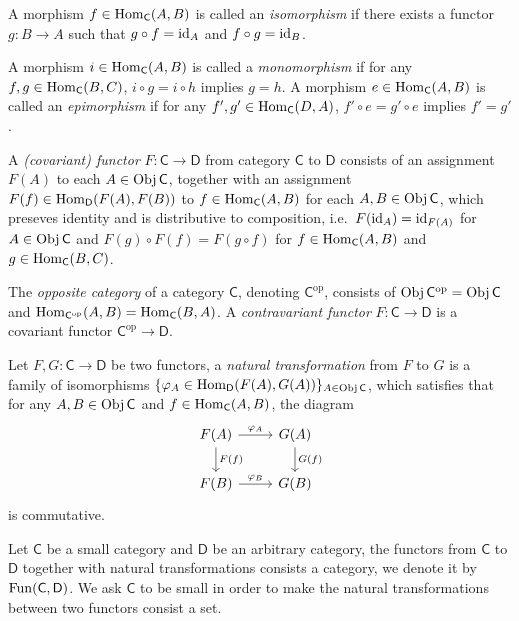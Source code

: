 \begin{defn}
    A morphism $f\in\operatorname{Hom}_\mathsf{C}(A,B)$ is called an \emph{isomorphism} if there exists a functor $g:B\to A$ such that $g\circ f=\mathrm{id}_A$ and $f\circ g=\mathrm{id}_B$.

    A morphism $i\in\operatorname{Hom}_\mathsf{C}(A,B)$ is called a \emph{monomorphism} if for any $f,g\in\operatorname{Hom}_\mathsf{C}(B,C)$, $i\circ g=i\circ h$ implies $g=h$.
    A morphism $e\in\operatorname{Hom}_\mathsf{C}(A,B)$ is called an \emph{epimorphism} if for any $f',g'\in\operatorname{Hom}_\mathsf{C}(D,A)$, $f'\circ e=g'\circ e$ implies $f'=g'$.
\end{defn}

\begin{defn}
    A \emph{(covariant) functor} $F:\mathsf{C}\to\mathsf{D}$ from category $\mathsf{C}$ to $\mathsf{D}$ consists of an assignment $F(A)$ to each $A\in\operatorname{Obj}\mathsf{C}$, together with an assignment $F(f)\in\operatorname{Hom}_\mathsf{D}(F(A),F(B))$ to $f\in\operatorname{Hom}_\mathsf{C}(A,B)$ for each $A,B\in\operatorname{Obj}\mathsf{C}$, which preseves identity and is distributive to composition, i.e.\ $F(\mathrm{id}_A)=\mathrm{id}_{F(A)}$ for $A\in\operatorname{Obj}\mathsf{C}$ and $F(g)\circ F(f)=F(g\circ f)$ for $f\in\operatorname{Hom}_\mathsf{C}(A,B)$ and $g\in\operatorname{Hom}_\mathsf{C}(B,C)$.
\end{defn}

\begin{defn}
    The \emph{opposite category} of a category $\mathsf{C}$, denoting $\mathsf{C}^{\mathrm{op}}$, consists of $\operatorname{Obj}\mathsf{C}^{\mathrm{op}}=\operatorname{Obj}\mathsf{C}$ and $\operatorname{Hom}_{\mathsf{C}^{\mathrm{op}}}(A,B)=\operatorname{Hom}_\mathsf{C}(B,A)$.
    A \emph{contravariant functor} $F:\mathsf{C}\to\mathsf{D}$ is a covariant functor $\mathsf{C}^{\mathrm{op}}\to\mathsf{D}$.
\end{defn}

\begin{defn}
    Let $F,G:\mathsf{C}\to\mathsf{D}$ be two functors, a \emph{natural transformation} from $F$ to $G$ is a family of isomorphisms $\{\varphi_A\in\operatorname{Hom}_{\mathsf{D}}(F(A),G(A))\}_{A\in\operatorname{Obj}\mathsf{C}}$, which satisfies that for any $A,B\in\operatorname{Obj}\mathsf{C}$ and $f\in\operatorname{Hom}_\mathsf{C}(A,B)$, the diagram
    \[\begin{tikzcd}
        F(A) \ar[r, "\varphi_A"] \ar[d, "F(f)"] & G(A) \ar[d, "G(f)"] \\
        F(B) \ar[r, "\varphi_B"] & G(B)
    \end{tikzcd}\]
    is commutative.
\end{defn}

\begin{eg}
    Let $\mathsf{C}$ be a small category and $\mathsf{D}$ be an arbitrary category, the functors from $\mathsf{C}$ to $\mathsf{D}$ together with natural transformations consists a category, we denote it by $\operatorname{Fun}(\mathsf{C},\mathsf{D})$.
    We ask $\mathsf{C}$ to be small in order to make the natural transformations between two functors consist a set.
\end{eg}

